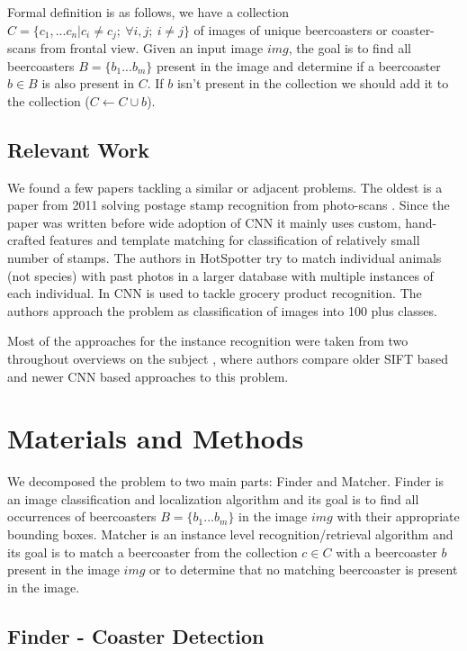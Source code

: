 \documentclass{article}
\begin{document}
Formal definition is as follows, we have a collection $C=\{c_1,...c_n | c_i \neq c_j;\ \forall i,j;\ i \neq j\}$ of images of unique beercoasters or coaster-scans from frontal view.
Given an input image $img$, the goal is to find all beercoasters $B=\{b_1...b_m\}$ present in the image 
and determine if a beercoaster $b \in B$ is also present in $C$. 
If $b$ isn't present in the collection we should add it to the collection ($C \leftarrow C \cup b$).

\subsection{Relevant Work}
We found a few papers tackling a similar or adjacent problems.
The oldest is a paper from 2011 solving postage stamp recognition from photo-scans \cite{}.
Since the paper was written before wide adoption of CNN it mainly uses custom, hand-crafted features and template matching for classification of relatively small number of stamps.
The authors in HotSpotter \cite{} try to match individual animals (not species) with past photos in a larger database with multiple instances of each individual.
In \cite{} CNN is used to tackle grocery product recognition. The authors approach the problem as classification of images into 100 plus classes.

Most of the approaches for the instance recognition were taken from two throughout overviews on the subject \cite{} \cite{},
where authors compare older SIFT based and newer CNN based approaches to this problem.



\section{Materials and Methods}
We decomposed the problem to two main parts: Finder and Matcher.
Finder is an image classification and localization algorithm and its goal is to find all
occurrences of beercoasters $B=\{b_1...b_m\}$ in the image $img$ with their appropriate bounding boxes.
Matcher is an instance level recognition/retrieval algorithm and its goal is to match 
a beercoaster from the collection $c \in C$ with a beercoaster $b$ present in the image $img$
or to determine that no matching beercoaster is present in the image.

\subsection{Finder - Coaster Detection}
\end{document}
